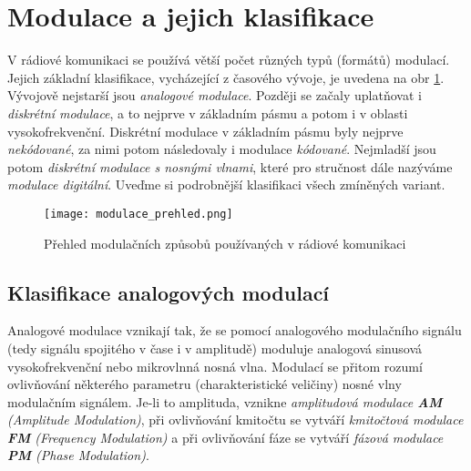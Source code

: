   \section{Modulace a jejich klasifikace}
    V rádiové komunikaci se používá větší počet různých typů (formátů) modulací. Jejich základní klasifikace, 
    vycházející z časového vývoje, je uvedena na obr \ref{fig_RA:modulace03}. Vývojově nejstarší jsou 
    \emph{analogové modulace}. Později se začaly uplatňovat i \emph{diskrétní modulace}, a to nejprve v 
    základním pásmu a potom i v oblasti vysokofrekvenční. Diskrétní modulace v základním pásmu byly nejprve 
    \emph{nekódované}, za nimi potom následovaly i modulace \emph{kódované}. Nejmladší jsou potom 
    \emph{diskrétní modulace s nosnými vlnami}, které pro stručnost dále nazýváme \emph{modulace digitální}. 
    Uveďme si podrobnější klasifikaci všech zmíněných variant. \cite[s.~82]{ZaludRA}
    \begin{figure}[ht!]  %
      \centering
      \texttt{[image: modulace\_prehled.png]}
      \caption{Přehled modulačních způsobů používaných v rádiové komunikaci}
      \label{fig_RA:modulace03}
    \end{figure}
    
    \subsection{Klasifikace analogových modulací}
      Analogové modulace vznikají tak, že se pomocí analogového modulačního signálu (tedy signálu spojitého v 
      čase i v amplitudě) moduluje analogová sinusová vysokofrekvenční nebo mikrovlnná nosná vlna. Modulací 
      se přitom rozumí ovlivňování některého parametru (charakteristické veličiny) nosné vlny modulačním 
      signálem. Je-li to amplituda, vznikne \emph{amplitudová modulace \textbf{AM} (Amplitude Modulation)}, 
      při ovlivňování kmitočtu se vytváří \emph{kmitočtová modulace \textbf{FM} (Frequency Modulation)} a při 
      ovlivňování fáze se vytváří \emph{fázová modulace \textbf{PM} (Phase Modulation)}.
      
